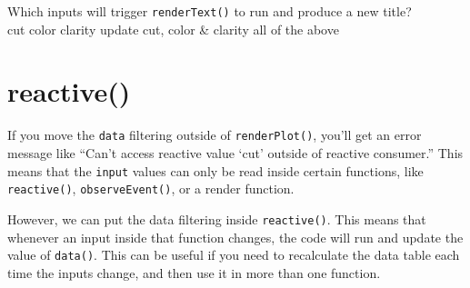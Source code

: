 \documentclass[
  oneside]{book}
\newenvironment{Shaded}{\begin{snugshade}}{\end{snugshade}}
\newcommand{\AttributeTok}[1]{\textcolor[rgb]{0.77,0.63,0.00}{#1}}
\newcommand{\ControlFlowTok}[1]{\textcolor[rgb]{0.13,0.29,0.53}{\textbf{#1}}}
\newcommand{\FloatTok}[1]{\textcolor[rgb]{0.00,0.00,0.81}{#1}}
\newcommand{\FunctionTok}[1]{\textcolor[rgb]{0.00,0.00,0.00}{#1}}
\newcommand{\NormalTok}[1]{#1}
\newcommand{\OtherTok}[1]{\textcolor[rgb]{0.56,0.35,0.01}{#1}}
\newcommand{\SpecialCharTok}[1]{\textcolor[rgb]{0.00,0.00,0.00}{#1}}
\newcommand{\StringTok}[1]{\textcolor[rgb]{0.31,0.60,0.02}{#1}}
\begin{document}
Which inputs will trigger \texttt{renderText}\texttt{()} to run and produce a new title?\\
cut color clarity update cut, color \& clarity all of the above

\hypertarget{reactive-1}{%
\section{reactive()}\label{reactive-1}}

If you move the \texttt{data} filtering outside of \texttt{renderPlot}\texttt{()}, you'll get an error message like ``Can't access reactive value `cut' outside of reactive consumer.'' This means that the \texttt{input} values can only be read inside certain functions, like \texttt{reactive}\texttt{()}, \texttt{observeEvent}\texttt{()}, or a render function.

However, we can put the data filtering inside \texttt{reactive}\texttt{()}. This means that whenever an input inside that function changes, the code will run and update the value of \texttt{data}\texttt{()}. This can be useful if you need to recalculate the data table each time the inputs change, and then use it in more than one function.

\begin{Shaded}
\end{Shaded}
\end{document}

